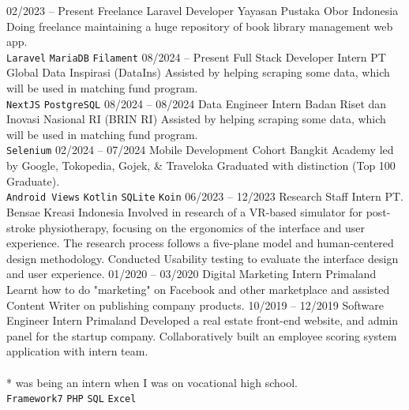\documentclass[9pt]{developercv} %
\begin{document}
\begin{entrylist}
	\entry
	{02/2023 -- Present}
	{Freelance Laravel Developer}
	{Yayasan Pustaka Obor Indonesia}
	{
	Doing freelance maintaining a huge repository of book library management web app.
	\\ \texttt{Laravel} \slashsep \texttt{MariaDB} \slashsep \texttt{Filament}}
	\entry
	{08/2024 -- Present}
	{Full Stack Developer Intern}
	{PT Global Data Inspirasi (DataIns)}
	{
	Assisted by helping scraping some data, which will be used in matching fund program.
	\\ \texttt{NextJS} \slashsep \texttt{PostgreSQL}}
	\entry
	{08/2024 -- 08/2024}
	{Data Engineer Intern}
	{Badan Riset dan Inovasi Nasional RI (BRIN RI)}
	{
	Assisted by helping scraping some data, which will be used in matching fund program.
	\\ \texttt{Selenium}}
	\entry
	{02/2024 -- 07/2024}
	{Mobile Development Cohort}
	{Bangkit Academy led by Google, Tokopedia, Gojek, \& Traveloka}
	{Graduated with distinction (Top 100 Graduate).
	\\ \texttt{Android Views} \slashsep \texttt{Kotlin} \slashsep \texttt{SQLite} \slashsep \texttt{Koin}}
	\entry
	{06/2023 -- 12/2023}
	{Research Staff Intern}
	{PT. Bensae Kreasi Indonesia}
	{Involved in research of a VR-based simulator for post-stroke physiotherapy, focusing on the ergonomics of the interface and user experience. The research process follows a five-plane model and human-centered design methodology. Conducted Usability testing to evaluate the interface design and user experience.}
	\entry
	{01/2020 -- 03/2020}
	{Digital Marketing Intern}
	{Primaland}
	{Learnt how to do "marketing" on Facebook and other marketplace and assisted Content Writer on publishing company products.}
	\entry
	{10/2019 -- 12/2019}
	{Software Engineer Intern}
	{Primaland}
	{{Developed a real estate front-end website, and admin panel for the startup company. Collaboratively built an employee scoring system application with intern team.}
	\vspace{-7 pt}
	\\ \\
	{* was being an intern when I was on vocational high school.}
	\\
	\texttt{Framework7} \slashsep \texttt{PHP} \slashsep \texttt{SQL} \slashsep \texttt{Excel}}
\end{entrylist}
\end{document}
